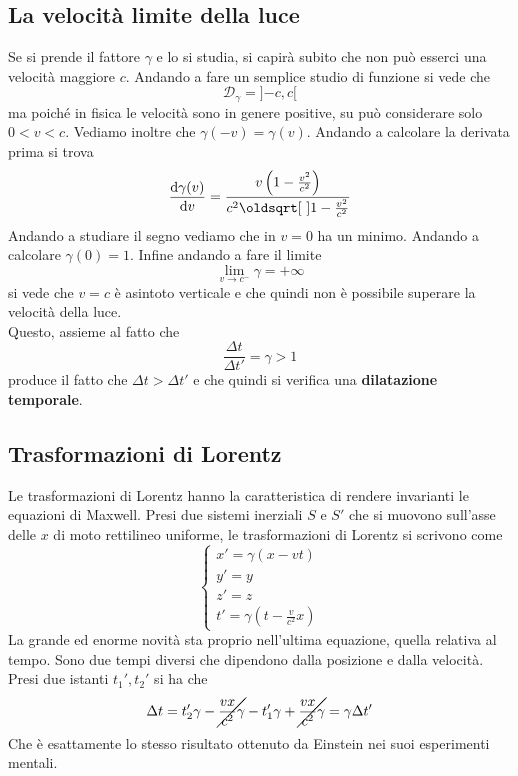 \subsection{La velocità limite della luce}
Se si prende il fattore $\gamma$ e lo si studia, si capirà subito che non può esserci una velocità
maggiore $c$. Andando a fare un semplice studio di funzione si vede che
\begin{equation*}
  \mathcal{D}_\gamma = ]{-c},{c}[
\end{equation*}
ma poiché in fisica le velocità sono in genere positive, su può considerare solo $0 < v < c$.
Vediamo inoltre che $\gamma(-v) = \gamma(v)$. Andando a calcolare la derivata prima si trova
\begin{equation*}
  \der{\gamma(v)}{v} = \frac{v \left( 1-\frac{v^2}{c^2} \right)}{c^2\sqrt{1-\frac{v^2}{c^2}}}
\end{equation*}
Andando a studiare il segno vediamo che in $v=0$ ha un minimo. Andando a calcolare $\gamma(0)=1$.
Infine andando a fare il limite
\begin{equation*}
  \lim\limits_{v\to c^-} \gamma = +\infty 
\end{equation*}
si vede che $v=c$ è asintoto verticale e che quindi non è possibile superare la velocità della 
luce.\\
Questo, assieme al fatto che
\begin{equation*}
  \frac{\Delta t}{\Delta t'}=\gamma > 1
\end{equation*}
produce il fatto che $\Delta t > \Delta t'$ e che quindi si verifica una \textbf{dilatazione 
temporale}.

\subsection{Trasformazioni di Lorentz}
Le trasformazioni di Lorentz hanno la caratteristica di rendere invarianti le equazioni di Maxwell.
Presi due sistemi inerziali $S$ e $S'$ che si muovono sull'asse delle $x$ di moto rettilineo 
uniforme, le trasformazioni di Lorentz si scrivono come
\begin{equation*}
  \begin{cases}
    x'= \gamma(x-vt)\\
    y'=y\\
    z'=z\\
    t'=\gamma(t-\frac{v}{c^2}x)
  \end{cases}
\end{equation*}
La grande ed enorme novità sta proprio nell'ultima equazione, quella relativa al tempo. Sono due 
tempi diversi che dipendono dalla posizione e dalla velocità.\\
Presi due istanti $t_1',t_2'$ si ha che
\begin{equation*}
  \Delta t = t'_2\gamma -\cancel{\frac{vx}{c^2}\gamma}-t'_1\gamma+\cancel{\frac{vx}{c^2}\gamma}=
  \gamma\Delta t'
\end{equation*}
Che è esattamente lo stesso risultato ottenuto da Einstein nei suoi esperimenti mentali.

